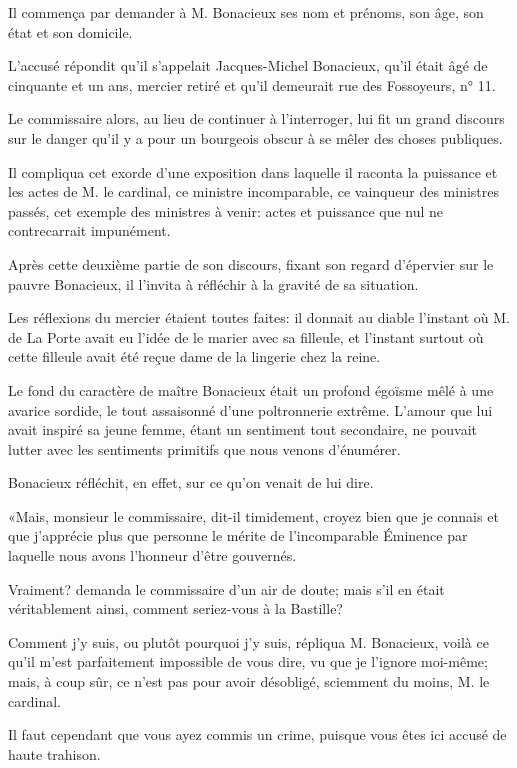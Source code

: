 Il commença par demander à M. Bonacieux ses nom et prénoms, son âge, son état et son domicile. 

L'accusé répondit qu'il s'appelait Jacques-Michel Bonacieux, qu'il était âgé de cinquante et un ans, mercier retiré et qu'il demeurait rue des Fossoyeurs, n° 11. 

Le commissaire alors, au lieu de continuer à l'interroger, lui fit un grand discours sur le danger qu'il y a pour un bourgeois obscur à se mêler des choses publiques. 

Il compliqua cet exorde d'une exposition dans laquelle il raconta la puissance et les actes de M. le cardinal, ce ministre incomparable, ce vainqueur des ministres passés, cet exemple des ministres à venir: actes et puissance que nul ne contrecarrait impunément. 

Après cette deuxième partie de son discours, fixant son regard d'épervier sur le pauvre Bonacieux, il l'invita à réfléchir à la gravité de sa situation. 

Les réflexions du mercier étaient toutes faites: il donnait au diable l'instant où M. de La Porte avait eu l'idée de le marier avec sa filleule, et l'instant surtout où cette filleule avait été reçue dame de la lingerie chez la reine. 

Le fond du caractère de maître Bonacieux était un profond égoïsme mêlé à une avarice sordide, le tout assaisonné d'une poltronnerie extrême. L'amour que lui avait inspiré sa jeune femme, étant un sentiment tout secondaire, ne pouvait lutter avec les sentiments primitifs que nous venons d'énumérer. 

Bonacieux réfléchit, en effet, sur ce qu'on venait de lui dire. 

«Mais, monsieur le commissaire, dit-il timidement, croyez bien que je connais et que j'apprécie plus que personne le mérite de l'incomparable Éminence par laquelle nous avons l'honneur d'être gouvernés. 

\speak  Vraiment? demanda le commissaire d'un air de doute; mais s'il en était véritablement ainsi, comment seriez-vous à la Bastille? 

\speak  Comment j'y suis, ou plutôt pourquoi j'y suis, répliqua M. Bonacieux, voilà ce qu'il m'est parfaitement impossible de vous dire, vu que je l'ignore moi-même; mais, à coup sûr, ce n'est pas pour avoir désobligé, sciemment du moins, M. le cardinal. 

\speak  Il faut cependant que vous ayez commis un crime, puisque vous êtes ici accusé de haute trahison. 

